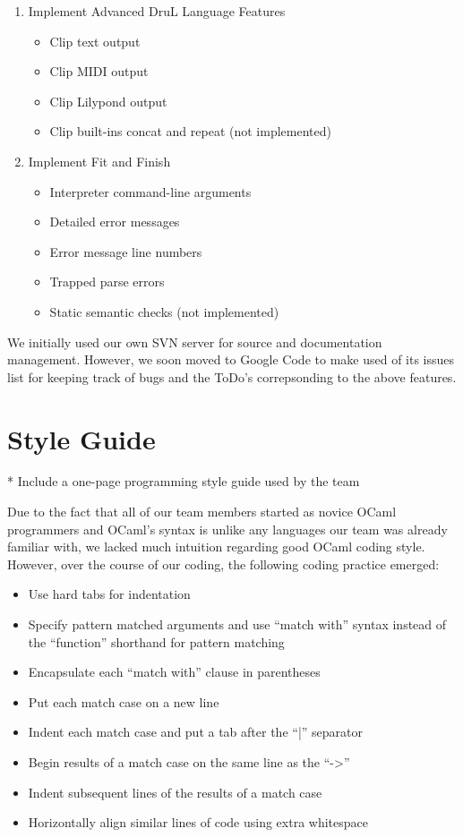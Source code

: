 \begin{enumerate}
\item Implement Advanced DruL Language Features
\begin{itemize}
	\item Clip text output
	\item Clip MIDI output
	\item Clip Lilypond output
	\item Clip built-ins concat and repeat (not implemented)
\end{itemize}

\item Implement Fit and Finish
\begin{itemize}
	\item Interpreter command-line arguments
	\item Detailed error messages
	\item Error message line numbers
	\item Trapped parse errors
	\item Static semantic checks (not implemented)
\end{itemize}

\end{enumerate}

We initially used our own SVN server for source and documentation management.  However, we soon moved to Google Code to make used of its issues list for keeping track of bugs and the ToDo's correpsonding to the above features.

\section{Style Guide}
* Include a one-page programming style guide used by the team

Due to the fact that all of our team members started as novice OCaml programmers and OCaml's syntax is unlike any languages our team was already familiar with, we lacked much intuition regarding good OCaml coding style.  However, over the course of our coding, the following coding practice emerged:

\begin{itemize}
	\item Use hard tabs for indentation
	\item Specify pattern matched arguments and use ``match with'' syntax instead of the ``function'' shorthand for pattern matching
	\item Encapsulate each ``match with'' clause in parentheses
	\item Put each match case on a new line
	\item Indent each match case and put a tab after the ``|'' separator
	\item Begin results of a match case on the same line as the ``->''
	\item Indent subsequent lines of the results of a match case
	\item Horizontally align similar lines of code using extra whitespace
\end{itemize}

